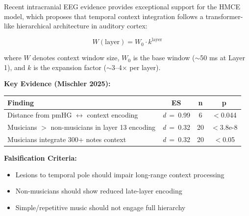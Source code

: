 \documentclass[9pt,onecolumn]{article}
\newcommand{\cohend}[1]{\textit{d}~=~#1}
\begin{document}
Recent intracranial EEG evidence provides exceptional support for the HMCE model, which proposes that temporal context integration follows a transformer-like hierarchical architecture in auditory cortex:

\begin{equation}
W(\text{layer}) = W_0 \cdot k^{\text{layer}}
\label{eq:context}
\end{equation}

where $W$ denotes context window size, $W_0$ is the base window ($\sim$50 ms at Layer 1), and $k$ is the expansion factor ($\sim$3--4$\times$ per layer).

\textbf{Key Evidence (Mischler 2025):}
\begin{center}
\small
\begin{tabular}{@{}lccc@{}}
\toprule
\textbf{Finding} & \textbf{ES} & \textbf{n} & \textbf{p} \\
\midrule
Distance from pmHG $\leftrightarrow$ context encoding & \cohend{0.99} & 6 & $<$0.044 \\
Musicians $>$ non-musicians in layer 13 encoding & \cohend{0.32} & 20 & $<$3.8e-8 \\
Musicians integrate 300+ notes context & \cohend{0.32} & 20 & $<$0.05 \\
\bottomrule
\end{tabular}
\end{center}

\textbf{Falsification Criteria:}
\begin{itemize}[leftmargin=*, topsep=0pt, itemsep=0pt]
\item Lesions to temporal pole should impair long-range context processing
\item Non-musicians should show reduced late-layer encoding
\item Simple/repetitive music should not engage full hierarchy
\end{itemize}
\end{document}
